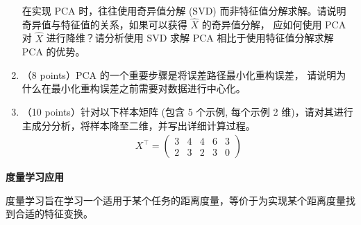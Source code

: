 \documentclass[answers]{exam}  %
\begin{document}
\begin{questions}
\begin{enumerate}
    \vspace{\baselineskip}在实现 PCA 时，往往使用奇异值分解 (SVD) 而非特征值分解求解。请说明奇异值与特征值的关系，如果可以获得 $\hat{X}$ 的奇异值分解， 应如何使用 PCA 对 $\hat{X}$ 进行降维？请分析使用 SVD 求解 PCA 相比于使用特征值分解求解 PCA 的优势。
    
    \item （8 points）PCA 的一个重要步骤是将误差路径最小化重构误差， 请说明为什么在最小化重构误差之前需要对数据进行中心化。
    
    \item （10 points）针对以下样本矩阵 (包含 5 个示例, 每个示例 2 维)，请对其进行主成分分析，将样本降至二维，并写出详细计算过程。
    \begin{align}
    X^\top = \begin{pmatrix}
    3 & 4 & 4 & 6 & 3 \\
    2 & 3 & 2 & 3 & 0
    \end{pmatrix}
    \end{align}
\end{enumerate}

\begin{solution}
\begin{parts}
	\part
	\part
     \part
     \part
\end{parts}
\end{solution}

\question [40] \textbf{度量学习应用}

度量学习旨在学习一个适用于某个任务的距离度量，等价于为实现某个距离度量找到合适的特征变换。

\end{questions}
\end{document}
